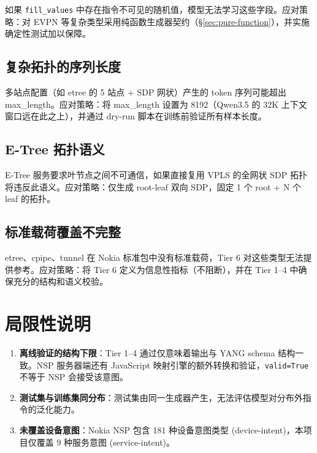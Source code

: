 \documentclass[12pt, a4paper]{article}
\newcommand{\yang}{\textsc{YANG}}
\newcommand{\nsp}{\textsc{NSP}}
\newcommand{\fillvalues}{\texttt{fill\_values}}
\begin{document}
如果 \fillvalues{} 中存在指令不可见的随机值，模型无法学习这些字段。应对策略：对 EVPN 等复杂类型采用纯函数生成器契约（\S\ref{sec:pure-function}），并实施确定性测试加以保障。

\subsection{复杂拓扑的序列长度}

多站点配置（如 etree 的 5 站点 + SDP 网状）产生的 token 序列可能超出 max\_length。应对策略：将 max\_length 设置为 8192（Qwen3.5 的 32K 上下文窗口远在此之上），并通过 dry-run 脚本在训练前验证所有样本长度。

\subsection{E-Tree 拓扑语义}

E-Tree 服务要求叶节点之间不可通信，如果直接复用 VPLS 的全网状 SDP 拓扑将违反此语义。应对策略：仅生成 root-leaf 双向 SDP，固定 1 个 root + N 个 leaf 的拓扑。

\subsection{标准载荷覆盖不完整}

etree、cpipe、tunnel 在 Nokia 标准包中没有标准载荷，Tier 6 对这些类型无法提供参考。应对策略：将 Tier 6 定义为信息性指标（不阻断），并在 Tier 1--4 中确保充分的结构和语义校验。

\section{局限性说明}
\label{sec:limitations}

\begin{enumerate}
  \item \textbf{离线验证的结构下限}：Tier 1--4 通过仅意味着输出与 \yang{} schema 结构一致。\nsp{} 服务器端还有 JavaScript 映射引擎的额外转换和验证，\texttt{valid=True} 不等于 \nsp{} 会接受该意图。
  \item \textbf{测试集与训练集同分布}：测试集由同一生成器产生，无法评估模型对分布外指令的泛化能力。
  \item \textbf{未覆盖设备意图}：Nokia \nsp{} 包含 181 种设备意图类型 (device-intent)，本项目仅覆盖 9 种服务意图 (service-intent)。
\end{enumerate}
\end{document}
